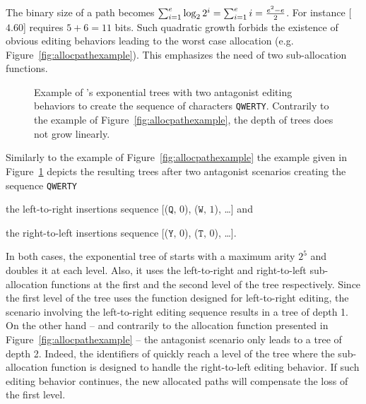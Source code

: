 \noindent The binary size of a path becomes
$\textstyle\sum\nolimits_{i=1}^{e}\log_2{2^i}=\sum\nolimits_{i=1}^{e}i=
{e^2-e\over{2}}$.
For instance [$4.60$] requires $5 + 6 = 11$ bits.  Such quadratic growth forbids
the existence of obvious editing behaviors leading to the worst case allocation
(e.g. Figure~\ref{fig:allocpathexample}). This emphasizes the need of two
sub-allocation functions.

\begin{figure}
  \centering
  \caption{\label{fig:lseqtreeexample} Example of \LSEQ's exponential trees with
    two antagonist editing behaviors to create the sequence of characters
    \texttt{QWERTY}. Contrarily to the example of
    Figure~\ref{fig:allocpathexample}, the depth of trees does not grow
    linearly.}
\end{figure}


Similarly to the example of Figure~\ref{fig:allocpathexample} the example given
in Figure~\ref{fig:lseqtreeexample} depicts the resulting trees after two
antagonist scenarios creating the sequence \texttt{QWERTY}
\begin{inparaenum}[(i)]
\item the left-to-right insertions sequence [($\texttt{Q},\,0$), ($\texttt{W},\,1$),
  \ldots] and
\item the right-to-left insertions sequence [($\texttt{Y},\,0$),
  ($\texttt{T},\,0$), \ldots].
\end{inparaenum}
In both cases, the exponential tree of \LSEQ starts with a maximum arity $2^5$
and doubles it at each level. Also, it uses the left-to-right and right-to-left
sub-allocation functions at the first and the second level of the tree
respectively. Since the first level of the tree uses the function designed for
left-to-right editing, the scenario involving the left-to-right editing sequence
results in a tree of depth 1. On the other hand -- and contrarily to the
allocation function presented in Figure~\ref{fig:allocpathexample} -- the
antagonist scenario only leads to a tree of depth 2. Indeed, the identifiers of
\LSEQ quickly reach a level of the tree where the sub-allocation function is
designed to handle the right-to-left editing behavior. If such editing behavior
continues, the new allocated paths will compensate the loss of the first level.

